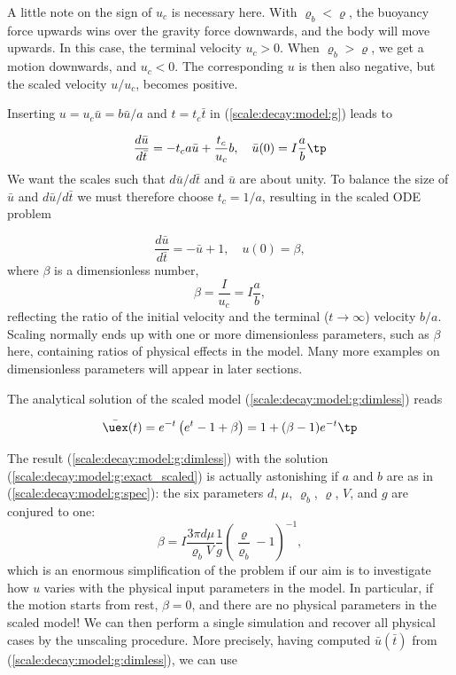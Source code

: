 \documentclass[graybox,envcountchap,sectrefs,final]{svmonodo}
\newenvironment{notice_mdfboxadmon}[1][]{
\begin{notice_mdfboxmdframed}[frametitle=#1]
}
{
\end{notice_mdfboxmdframed}
}
\begin{document}
\begin{notice_mdfboxadmon}
A little note on the sign of $u_c$ is necessary here.
With $\varrho_b < \varrho$, the buoyancy force upwards wins over the
gravity force downwards, and the body will move upwards. In this case,
the terminal velocity $u_c > 0$. When $\varrho_b > \varrho$, we get
a motion downwards, and $u_c < 0$. The corresponding $u$ is then also
negative, but the scaled velocity $u/u_c$, becomes positive.
\end{notice_mdfboxadmon}




Inserting $u = u_c\bar u = b\bar u/a$ and $t=t_c\bar t$ in
(\ref{scale:decay:model:g}) leads to

\[
\frac{d\bar u}{d\bar t} = -t_c a\bar u + \frac{t_c}{u_c}b,
\quad \bar u(0) = I\frac{a}{b}
\tp
\]
We want the scales such that $d\bar u/d\bar t$ and $\bar u$ are
about unity.
To balance the size of $\bar u$ and $d\bar u/d\bar t$ we must
therefore choose
$t_c = 1/a$, resulting in the scaled ODE problem

\begin{equation}
\frac{d\bar u}{d\bar t} = -\bar u + 1,\quad u(0)=\beta,
\label{scale:decay:model:g:dimless}
\end{equation}
where $\beta$ is a dimensionless number,
\begin{equation}
\beta = \frac{I}{u_c} = I\frac{a}{b},
\end{equation}
reflecting the ratio of the initial velocity and the
terminal ($t\rightarrow \infty$) velocity $b/a$.
Scaling normally ends up with one or more dimensionless parameters,
such as $\beta$ here, containing ratios of physical effects in
the model. Many more examples on dimensionless parameters will appear
in later sections.

The analytical solution of the scaled model
(\ref{scale:decay:model:g:dimless}) reads

\begin{equation}
\bar\uex(t) =
e^{-t}\left( e^{t}-1 + \beta\right) = 1 + (\beta -1)e^{-t}\tp
\label{scale:decay:model:g:exact_scaled}
\end{equation}

The result (\ref{scale:decay:model:g:dimless}) with the
solution (\ref{scale:decay:model:g:exact_scaled}) is actually
astonishing if $a$ and $b$ are as in (\ref{scale:decay:model:g:spec}):
the six parameters $d$, $\mu$, $\varrho_b$, $\varrho$, $V$, and $g$
are conjured to one:
\[ \beta = I\frac{3\pi d\mu}{\varrho_b V}
\frac{1}{g}\left(\frac{\varrho}{\varrho_b} -1\right)^{-1},
\]
which is an enormous simplification of the problem if our aim is to
investigate how $u$ varies with the physical input parameters in
the model.
In particular, if the motion starts from rest, $\beta=0$, and
there are no physical parameters in the scaled model!
We can then perform a single simulation and recover all physical
cases by the unscaling procedure. More precisely,
having computed $\bar u(\bar t)$ from (\ref{scale:decay:model:g:dimless}),
we can use
\end{document}
